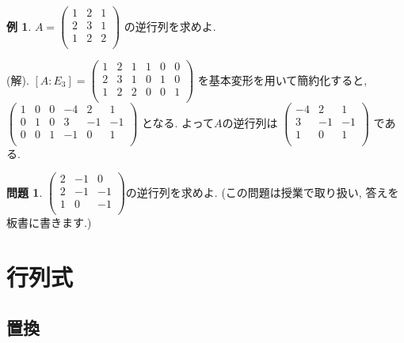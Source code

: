 \documentclass[dvipdfmx,a4paper,11pt]{article}
\theoremstyle{definition}
\newtheorem{exa}[thm]{例}
\newtheorem{ques}[thm]{問題}
\begin{document}
 \begin{exa}
 $
  A=\begin{pmatrix}
 1& 2&1 \\
 2& 3 & 1 \\
 1& 2 &  2 \\
 \end{pmatrix} 
 $
 の逆行列を求めよ.
 
 (解).
 $[A:E_3] = 
 \begin{pmatrix}
 1& 2&1  &1& 0&0 \\
 2& 3 & 1 &0& 1&0 \\
 1& 2 &  2 &0& 0&1 \\
 \end{pmatrix} 
 $
 を基本変形を用いて簡約化すると, \\
 $
 \begin{pmatrix}
 1& 0&0  &-4& 2&1 \\
 0& 1 & 0 &3& -1&-1 \\
 0& 0&  1 &-1& 0&1 \\
 \end{pmatrix} 
 $
 となる. よって$A$の逆行列は
 $
 \begin{pmatrix}
-4& 2&1 \\
3& -1&-1\\
1& 0&1 \\
 \end{pmatrix} 
 $
 である.
 \end{exa}


\begin{ques}
$
\begin{pmatrix}
 2& -1& 0\\
 2& -1 & -1 \\
 1& 0 &  -1 \\
 \end{pmatrix} 
 $の逆行列を求めよ. (この問題は授業で取り扱い, 答えを板書に書きます.)
\end{ques}


\section{行列式 \cite[3章]{M}}
\label{sec:det}


\subsection{置換 \cite[3.1節]{M}}
\end{document}
